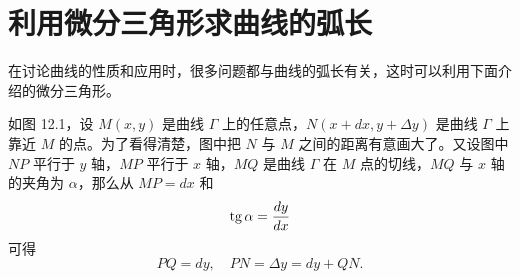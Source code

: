 \section{利用微分三角形求曲线的弧长}

在讨论曲线的性质和应用时，很多问题都与曲线的弧长有关，这时可以利用下面介绍的微分三角形。

如图 12.1，设 $M(x, y)$ 是曲线 $\Gamma$ 上的任意点，$N(x + dx, y + \Delta y)$ 是曲线 $\Gamma$ 上靠近 $M$ 的点。为了看得清楚，图中把 $N$ 与 $M$ 之间的距离有意画大了。又设图中 $NP$ 平行于 $y$ 轴，$MP$ 平行于 $x$ 轴，$MQ$ 是曲线 $\Gamma$ 在 $M$ 点的切线，$MQ$ 与 $x$ 轴的夹角为 $\alpha$，那么从 $MP = dx$ 和
\[
  \operatorname{tg}\alpha = \frac{dy}{dx}
\]
可得
\[
  PQ = dy,\quad PN = \Delta y = dy + QN.
\]

